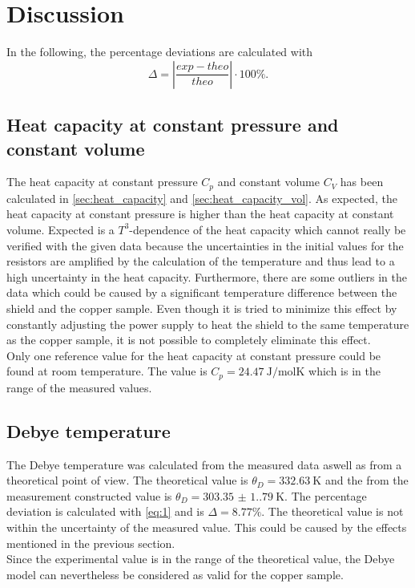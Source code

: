 \section{Discussion}
\label{sec:Diskussion}
In the following, the percentage deviations are calculated with
\begin{equation}\label{eq:1}
    \Delta = |\frac{exp - theo}{theo}|\cdot 100\%.
\end{equation}

\subsection{Heat capacity at constant pressure and constant volume}

The heat capacity at constant pressure $C_p$ and constant volume $C_V$ has been calculated in \autoref{sec:heat_capacity} and \autoref{sec:heat_capacity_vol}. As expected, the heat capacity
at constant pressure is higher than the heat capacity at constant volume. Expected is a $T^3$-dependence of the heat capacity which cannot really be verified with the given data because the 
uncertainties in the initial values for the resistors are amplified by the calculation of the temperature and thus lead to a high uncertainty in the heat capacity. 
Furthermore, there are some outliers in the data which could be caused by a significant temperature difference between the shield and the copper sample. Even though it is tried to minimize this
effect by constantly adjusting the power supply to heat the shield to the same temperature as the copper sample, it is not possible to completely eliminate this effect.\\
Only one reference value for the heat capacity at constant pressure could be found \cite{c_p} at room temperature. The value is $C_p = \SI{24.47}{\joule/\mol\kelvin}$ which is in the range of the
measured values.\\

\subsection{Debye temperature}
The Debye temperature was calculated from the measured data aswell as from a theoretical point of view. The theoretical value is $\theta_D = \SI{332.63}{\kelvin}$ and the from the measurement 
constructed value is $\theta_D = \SI{303.35(1.79)}{\kelvin}$. The percentage deviation is calculated with \autoref{eq:1} and is $\Delta = 8.77\%$. The theoretical value is not within the
uncertainty of the measured value. This could be caused by the effects mentioned in the previous section.\\
Since the experimental value is in the range of the theoretical value, the Debye model can nevertheless be considered as valid for the copper sample.\\
\newpage